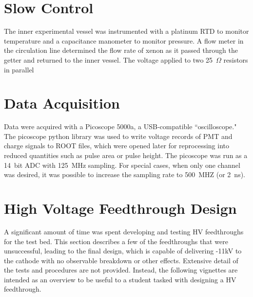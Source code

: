 
\section{Slow Control}
The inner experimental vessel was instrumented with a platinum RTD to monitor temperature and a capacitance manometer to monitor pressure. A flow meter in the circulation line determined the flow rate of xenon as it passed through the getter and returned to the inner vessel. The voltage applied to two 25~$\Omega$ resistors in parallel


\section{Data Acquisition}
Data were acquired with a Picoscope 5000a, a USB-compatible ``oscilloscope." The picoscope python library was used to write voltage records of PMT and charge signals to ROOT files, which were opened later for reprocessing into reduced quantities such as pulse area or pulse height. The picoscope was run as a 14~bit ADC with 125~MHz sampling. For special cases, when only one channel was desired, it was possible to increase the sampling rate to 500~MHZ (or 2~ns). 


\section{High Voltage Feedthrough Design}
A significant amount of time was spent developing and testing \ac{HV} feedthroughs for the test bed. This section describes a few of the feedthroughs that were unsuccessful, leading to the final design, which is capable of delivering -11kV to the cathode with no observable breakdown or other effects. Extensive detail of the tests and procedures are not provided. Instead, the following vignettes are intended as an overview to be useful to a student tasked with designing a HV feedthrough. 

